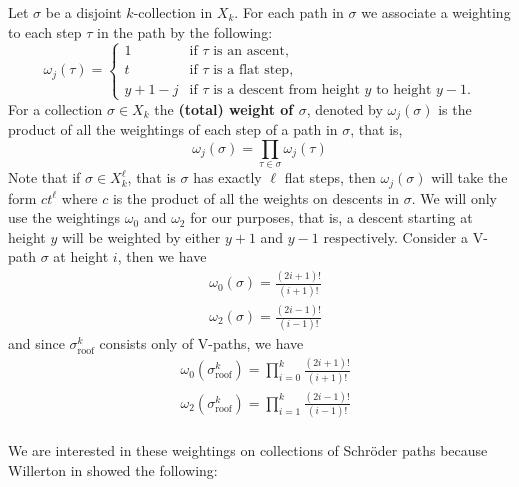 \documentclass[11pt]{article}
\theoremstyle{definition}
\theoremstyle{definition}
\theoremstyle{plain}
\theoremstyle{plain}
\theoremstyle{plain}
\theoremstyle{definition}
\begin{document}
Let $\sigma$ be a disjoint $k$-collection in $X_k$. For each path in $\sigma$ we associate a weighting to each step $\tau$ in the path by the following:
\begin{equation*}
\omega_j(\tau) = \begin{cases} 
1 &\text{if $\tau$ is an ascent,} \\
t &\text{if $\tau$ is a flat step,} \\
y+1-j &\text{if $\tau$ is a descent from height $y$ to height $y-1$.}
\end{cases}
\end{equation*}
For a collection $\sigma\in X_k$ the \textbf{(total) weight of $\sigma$}, denoted by $\omega_j(\sigma)$ is the product of all the weightings of each step of a path in $\sigma$, that is,
\begin{equation*}
\omega_j(\sigma) = \prod\limits_{\tau\in\sigma}\omega_j(\tau)
\end{equation*}
Note that if $\sigma \in X_k^\ell$, that is $\sigma$ has exactly $\ell$ flat steps, then $\omega_j(\sigma)$ will take the form $ct^\ell$ where $c$ is the product of all the weights on descents in $\sigma$. We will only use the weightings $\omega_0$ and $\omega_2$ for our purposes, that is, a descent starting at height $y$ will be weighted by either $y+1$ and $y-1$ respectively. Consider a V-path $\sigma$ at height $i$, then we have
\begin{align*}
&\omega_0(\sigma) = \frac{(2i+1)!}{(i+1)!} \\
&\omega_2(\sigma) = \frac{(2i-1)!}{(i-1)!}
\end{align*}
and since $\sigma_{\text{roof}}^k$ consists only of V-paths, we have
\begin{align*}
&\omega_0\left(\sigma_{\text{roof}}^k\right) = \prod\limits_{i=0}^k\frac{(2i+1)!}{(i+1)!} \\
&\omega_2\left(\sigma_{\text{roof}}^k\right) = \prod\limits_{i=1}^k\frac{(2i-1)!}{(i-1)!} \\
\end{align*}

We are interested in these weightings on collections of Schröder paths because Willerton in \cite{willerton_magnitude_2017} showed the following:
\end{document}
